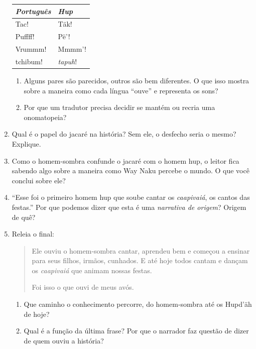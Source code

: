 \begin{enumerate}[label=\arabic*.]
\begin{center}
\begin{tabular}{p{.35\linewidth}p{.35\linewidth}}
\textit{Português} & \textit{Hup}\\
\hline
Tac! & Täk!\\
Puffff! & Pë'!\\
Vrummm! & Mmmm'!\\
tchibum! & \textit{tapuh}!\\
\end{tabular}
\end{center}

\begin{enumerate}[label=\alph*)]
\item Alguns pares são parecidos, outros são bem diferentes. O que isso
mostra sobre a maneira como cada língua ``ouve'' e representa os sons?
\item Por que um tradutor precisa decidir se mantém ou recria uma
onomatopeia?
\end{enumerate}

\item Qual é o papel do jacaré na história? Sem ele, o desfecho seria o
mesmo? Explique.

\item Como o homem-sombra confunde o jacaré com o homem hup, o leitor
fica sabendo algo sobre a maneira como Way Naku percebe o mundo. O que
você conclui sobre ele?

\item ``Esse foi o primeiro homem hup que soube cantar os
\textit{caapivaiá}, os cantos das festas.'' Por que podemos dizer que
esta é uma \textit{narrativa de origem}? Origem de quê?

\item Releia o final:
\begin{quote}
Ele ouviu o homem-sombra cantar, aprendeu bem e começou a ensinar para
seus filhos, irmãos, cunhados. E até hoje todos cantam e dançam os
\textit{caapivaiá} que animam nossas festas.

Foi isso o que ouvi de meus avós.
\end{quote}
\begin{enumerate}[label=\alph*)]
\item Que caminho o conhecimento percorre, do homem-sombra até os
Hupd'äh de hoje?
\item Qual é a função da última frase? Por que o narrador faz questão de
dizer de quem ouviu a história?
\end{enumerate}


\end{enumerate}
